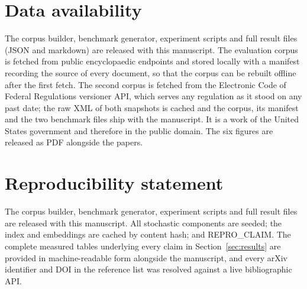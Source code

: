 \documentclass[preprint,3p,times]{elsarticle}
\begin{document}
\section*{Data availability}
The corpus builder, benchmark generator, experiment scripts and full result
files (JSON and markdown) are released with this manuscript. The evaluation
corpus is fetched from public encyclopaedic endpoints and stored locally with a
manifest recording the source of every document, so that the corpus can be
rebuilt offline after the first fetch. The second corpus is fetched from the
Electronic Code of Federal Regulations versioner API, which serves any
regulation as it stood on any past date; the raw XML of both snapshots is
cached and the corpus, its manifest and the two benchmark files ship with the
manuscript. It is a work of the United States government and therefore in the
public domain. The six figures are released as PDF alongside the papers.

\section*{Reproducibility statement}
The corpus builder, benchmark generator, experiment scripts and full result
files are released with this manuscript. All stochastic components are seeded;
the index and embeddings are cached by content hash; and
{{REPRO_CLAIM}}. The complete measured tables underlying
every claim in Section~\ref{sec:results} are provided in machine-readable form
alongside the manuscript, and every arXiv identifier and DOI in the reference
list was resolved against a live bibliographic API.
\end{document}
